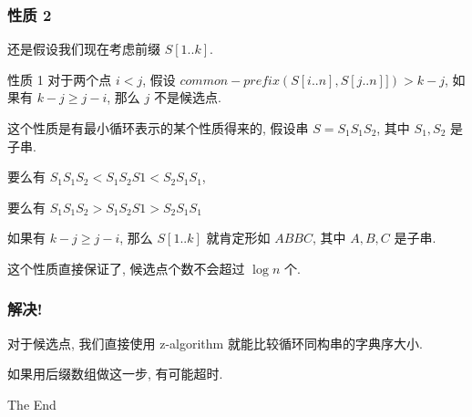 \documentclass{beamer}
\begin{document}
\begin{frame}
\frametitle{性质 2}
还是假设我们现在考虑前缀 $S[1..k]$. 

\begin{block}{性质 1}
对于两个点 $i < j$, 假设 $common-prefix(S[i..n], S[j..n]]) > k - j$, 
如果有 $k - j \ge j - i$, 那么 $j$ 不是候选点. 
\end{block}

这个性质是有最小循环表示的某个性质得来的, 假设串 $S=S_1S_1S_2$, 其中 $S_1, S_2$ 是子串. 

要么有 $S_1 S_1 S_2 < S_1 S_2 S1 < S_2 S_1 S_1$, 

要么有 $S_1 S_1 S_2 > S_1 S_2 S1 > S_2 S_1 S_1$

如果有 $k - j \ge j - i$, 那么 $S[1..k]$ 就肯定形如 $ABBC$, 其中 $A, B, C$ 是子串. 

这个性质直接保证了, 候选点个数不会超过 $\log n$ 个. 
\end{frame}

\begin{frame}
\frametitle{解决!}
对于候选点, 我们直接使用 z-algorithm 就能比较循环同构串的字典序大小. 

如果用后缀数组做这一步, 有可能超时. 
\end{frame}

\begin{frame}
\Huge{\centerline{The End}}
\end{frame}

\end{document}
